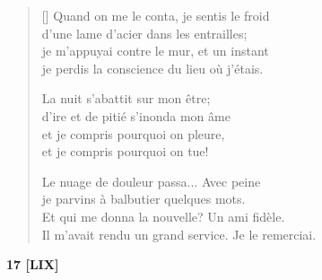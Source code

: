 \documentclass[a4paper,12pt]{book}
\begin{document}
\settowidth{\versewidth}{Il m'avait rendu service!... Je le remerciai.}

\begin{verse}[\versewidth]
  Quand on me le conta, je sentis le froid \\
  d'une lame d'acier dans les entrailles; \\
  je m'appuyai contre le mur, et un instant \\
  je perdis la conscience du lieu où j'étais.

  La nuit s'abattit sur mon être; \\
  d'ire et de pitié s'inonda mon âme \\
  et je compris pourquoi on pleure, \\
  et je compris pourquoi on tue!

  Le nuage de douleur passa... Avec peine \\
  je parvins à balbutier quelques mots. \\
  Et qui me donna la nouvelle? Un ami fidèle. \\
  Il m'avait rendu un grand service. Je le remerciai.
\end{verse}

\bigskip

\begin{center}
  \textbf{17 [LIX]}
\end{center}

\settowidth{\versewidth}{pendant que tu éprouves tant et ne sais rien,}
\end{document}
